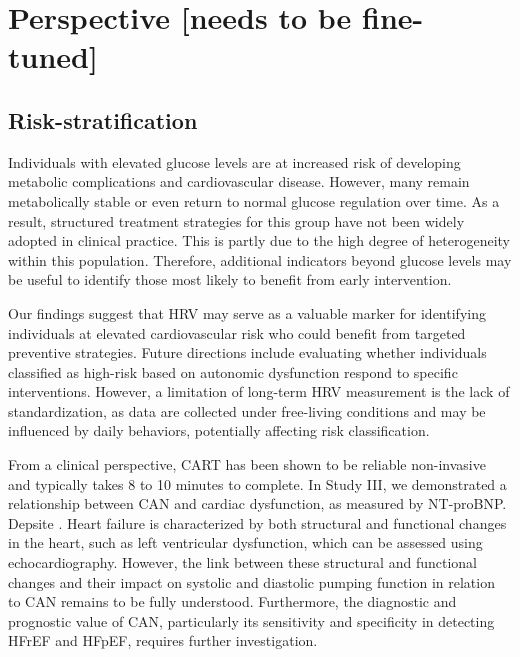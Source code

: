 \documentclass[
  a4paper,
  headsepline=true,
  open=any]{scrbook}
\begin{document}

\hypertarget{perspective-needs-to-be-fine-tuned}{%
\chapter{Perspective {[}needs to be
fine-tuned{]}}\label{perspective-needs-to-be-fine-tuned}}

\hypertarget{risk-stratification-1}{%
\section{Risk-stratification}\label{risk-stratification-1}}

Individuals with elevated glucose levels are at increased risk of
developing metabolic complications and cardiovascular disease. However,
many remain metabolically stable or even return to normal glucose
regulation over time. As a result, structured treatment strategies for
this group have not been widely adopted in clinical practice. This is
partly due to the high degree of heterogeneity within this population.
Therefore, additional indicators beyond glucose levels may be useful to
identify those most likely to benefit from early intervention.

Our findings suggest that HRV may serve as a valuable marker for
identifying individuals at elevated cardiovascular risk who could
benefit from targeted preventive strategies. Future directions include
evaluating whether individuals classified as high-risk based on
autonomic dysfunction respond to specific interventions. However, a
limitation of long-term HRV measurement is the lack of standardization,
as data are collected under free-living conditions and may be influenced
by daily behaviors, potentially affecting risk classification.

From a clinical perspective, CART has been shown to be reliable
non-invasive and typically takes 8 to 10 minutes to complete. In Study
III, we demonstrated a relationship between CAN and cardiac dysfunction,
as measured by NT-proBNP. Depsite . Heart failure is characterized by
both structural and functional changes in the heart, such as left
ventricular dysfunction, which can be assessed using echocardiography.
However, the link between these structural and functional changes and
their impact on systolic and diastolic pumping function in relation to
CAN remains to be fully understood. Furthermore, the diagnostic and
prognostic value of CAN, particularly its sensitivity and specificity in
detecting HFrEF and HFpEF, requires further investigation.
\end{document}
